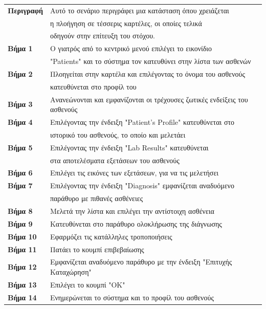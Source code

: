 \documentclass{article}
\newcommand\T{\rule{0pt}{2.6ex}}       %
\newcommand\B{\rule[-1.2ex]{0pt}{0pt}}
\begin{document}
 \begin{center}
     \begin{tabular}{|l|l|}
     \hline
      \textbf{Περιγραφή} & Αυτό το σενάριο περιγράφει μια κατάσταση όπου χρειάζεται \T \\& η πλοήγηση σε τέσσερις καρτέλες, οι οποίες τελικά\\& οδηγούν στην επίτευξη του στόχου. \B \\ 
      \hline
      \textbf{Βήμα 1} & Ο γιατρός από το κεντρικό μενού επιλέγει το εικονίδιο \T \\& "Patients" και το σύστημα τον κατευθύνει στην λίστα των ασθενών \B \\
      \hline
      \textbf{Βήμα 2} & Πλοηγείται στην καρτέλα και επιλέγοντας το όνομα του ασθενούς \T \\& κατευθύνεται στο προφίλ του  \B \\
      \hline
      \textbf{Βήμα 3} & Ανανεώνονται και εμφανίζονται οι τρέχουσες ζωτικές ενδείξεις του ασθενούς \T\B \\
      \hline
      \textbf{Βήμα 4} & Επιλέγοντας την ένδειξη "Patient's Profile" κατευθύνεται στο \T\\& ιστορικό του ασθενούς, το οποίο και μελετάει \B \\
      \hline
      \textbf{Βήμα 5} & Επιλέγοντας την ένδειξη "Lab Results" κατευθύνεται \T \\& στα αποτελέσματα εξετάσεων του ασθενούς \B \\
      \hline
      \textbf{Βήμα 6} & Επιλέγει τις εικόνες των εξετάσεων, για να τις μελετήσει \T\B \\
      \hline
      \textbf{Βήμα 7} & Επιλέγοντας την ένδειξη "Diagnosis" εμφανίζεται αναδυόμενο \T \\& παράθυρο με πιθανές ασθένειες \B \\
      \hline
      \textbf{Βήμα 8} & Μελετά την λίστα και επιλέγει την αντίστοιχη ασθένεια\T\B \\
      \hline      
      \textbf{Βήμα 9} & Κατευθύνεται στο παράθυρο ολοκλήρωσης της διάγνωσης \T\B \\
      \hline
      \textbf{Βήμα 10} & Εφαρμόζει τις κατάλληλες τροποποιήσεις \T\B \\
      \hline
      \textbf{Βήμα 11} & Πατάει το κουμπί επιβεβαίωσης \T\B \\
      \hline
      \textbf{Βήμα 12} & Εμφανίζεται αναδυόμενο παράθυρο με την ένδειξη "Επιτυχής Καταχώρηση" \T\B \\
      \hline    
      \textbf{Βήμα 13} & Επιλέγει το κουμπί "ΟΚ"\T\B \\ 
      \hline
      \textbf{Βήμα 14} & Ενημερώνεται το σύστημα και το προφίλ του ασθενούς \T\B \\
      \hline
     \end{tabular}
 \end{center}
 
\end{document}
